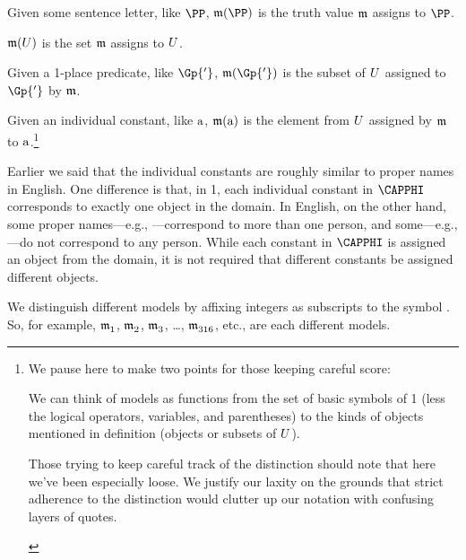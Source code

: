 \begin{cenumerate}
	\item Given some sentence letter, like $\PP$, $\IntA(\PP)$ is the truth value $\mathfrak{m}$ assigns to $\PP$.
	\item $\mathfrak{m}(U)$ is the set $\mathfrak{m}$ assigns to $U$.
	\item Given a 1-place predicate, like $\Gp{'}$, $\IntA(\Gp{'})$ is the subset of $U$ assigned to $\Gp{'}$ by $\mathfrak{m}$.
	\item Given an individual constant, like $\mathrm{a}$, $\mathfrak{m}(\mathrm{a})$ is the element from $U$ assigned by $\mathfrak{m}$ to $\mathrm{a}$.\footnote{%
		We pause here to make two points for those keeping careful score:
		\begin{enumerate*}[label=(\arabic*)]
		\item We can think of models as functions from the set of basic symbols of \GQL{}1 (less the logical operators, variables, and parentheses) to the kinds of objects mentioned in definition  (objects or subsets of $U$). 
		\item\label{pointtwo} Those trying to keep careful track of the  distinction should note that here we've been especially loose. 
		We justify our laxity on the grounds that strict adherence to the distinction would clutter up our notation with confusing layers of quotes. 
		\end{enumerate*}
		\label{Int Footnote}
	} 
\end{cenumerate}

\noindent{}Earlier we said that the individual constants are roughly similar to proper names in English.
One difference is that, in \GQL{}1, each individual constant in $\CAPPHI$ corresponds to exactly one object in the domain.
In English, on the other hand, some proper names---e.g., ---correspond to more than one person, and some---e.g., ---do not correspond to any person.
While each constant in $\CAPPHI$ is assigned an object from the domain, it is not required that different constants be assigned different objects. 

We distinguish different models by affixing integers as subscripts to the symbol \mention{$\As{}{}$}.  So, for example, $\mathfrak{m^{\mathrm{}}_{\mathrm{1}}}$, $\mathfrak{m^{\mathrm{}}_{\mathrm{2}}}$, $\mathfrak{m^{\mathrm{}}_{\mathrm{3}}}$, \ldots, $\mathfrak{m^{\mathrm{}}_{\mathrm{316}}}$, etc., are each different models.


